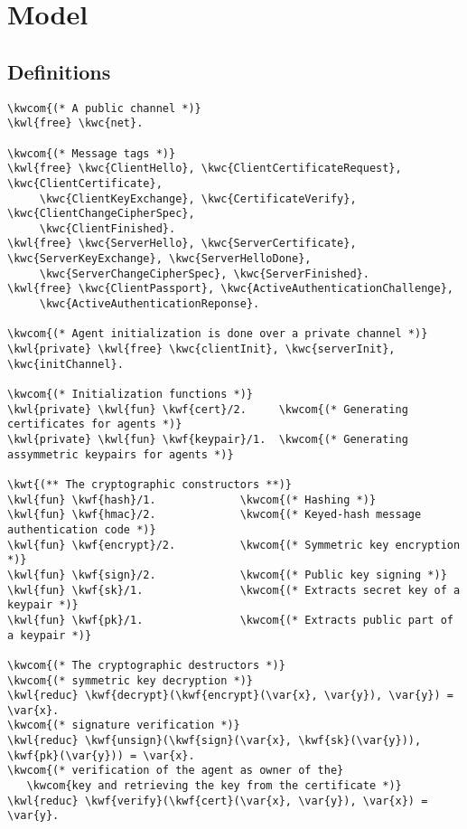 \chapter{Model}
\label{app:model}

\section{Definitions}
\begin{Verbatim}[commandchars=\\\{\}]
\kwcom{(* A public channel *)}
\kwl{free} \kwc{net}.

\kwcom{(* Message tags *)}
\kwl{free} \kwc{ClientHello}, \kwc{ClientCertificateRequest}, \kwc{ClientCertificate}, 
     \kwc{ClientKeyExchange}, \kwc{CertificateVerify}, \kwc{ClientChangeCipherSpec}, 
     \kwc{ClientFinished}.
\kwl{free} \kwc{ServerHello}, \kwc{ServerCertificate}, \kwc{ServerKeyExchange}, \kwc{ServerHelloDone}, 
     \kwc{ServerChangeCipherSpec}, \kwc{ServerFinished}.
\kwl{free} \kwc{ClientPassport}, \kwc{ActiveAuthenticationChallenge}, 
     \kwc{ActiveAuthenticationReponse}.

\kwcom{(* Agent initialization is done over a private channel *)}
\kwl{private} \kwl{free} \kwc{clientInit}, \kwc{serverInit}, \kwc{initChannel}.

\kwcom{(* Initialization functions *)}
\kwl{private} \kwl{fun} \kwf{cert}/2.     \kwcom{(* Generating certificates for agents *)}
\kwl{private} \kwl{fun} \kwf{keypair}/1.  \kwcom{(* Generating assymmetric keypairs for agents *)}

\kwt{(** The cryptographic constructors **)}
\kwl{fun} \kwf{hash}/1.             \kwcom{(* Hashing *)}
\kwl{fun} \kwf{hmac}/2.             \kwcom{(* Keyed-hash message authentication code *)}
\kwl{fun} \kwf{encrypt}/2.          \kwcom{(* Symmetric key encryption *)}
\kwl{fun} \kwf{sign}/2.             \kwcom{(* Public key signing *)}
\kwl{fun} \kwf{sk}/1.               \kwcom{(* Extracts secret key of a keypair *)}
\kwl{fun} \kwf{pk}/1.               \kwcom{(* Extracts public part of a keypair *)}

\kwcom{(* The cryptographic destructors *)}
\kwcom{(* symmetric key decryption *)}
\kwl{reduc} \kwf{decrypt}(\kwf{encrypt}(\var{x}, \var{y}), \var{y}) = \var{x}.
\kwcom{(* signature verification *)}
\kwl{reduc} \kwf{unsign}(\kwf{sign}(\var{x}, \kwf{sk}(\var{y})), \kwf{pk}(\var{y})) = \var{x}.
\kwcom{(* verification of the agent as owner of the}
   \kwcom{key and retrieving the key from the certificate *)}
\kwl{reduc} \kwf{verify}(\kwf{cert}(\var{x}, \var{y}), \var{x}) = \var{y}.


\end{Verbatim}
